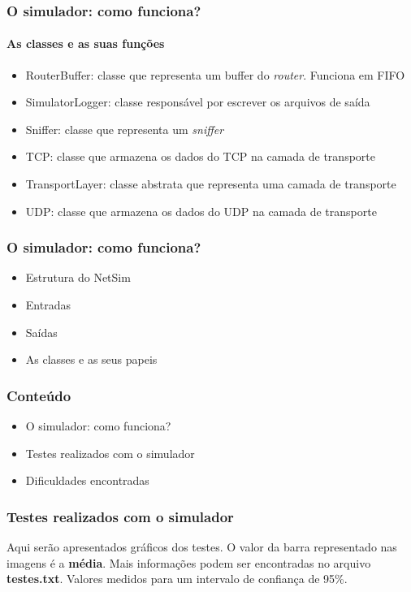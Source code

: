 \documentclass{beamer}
\begin{document}
\begin{frame}
	\frametitle{O simulador: como funciona?}
	\framesubtitle{As classes e as suas funções}
	\begin{itemize}
		\item RouterBuffer: classe que representa um buffer do \textit{router}. Funciona em FIFO
		\item SimulatorLogger: classe responsável por escrever os arquivos de saída
		\item Sniffer: classe que representa um \textit{sniffer}
		\item TCP: classe que armazena os dados do TCP na camada de transporte
		\item TransportLayer: classe abstrata que representa uma camada de transporte
		\item UDP: classe que armazena os dados do UDP na camada de transporte
	\end{itemize}
\end{frame}

\begin{frame}
	\frametitle{O simulador: como funciona?}
	\begin{itemize}
		\item \textcolor{covered}{Estrutura do NetSim}
		\item \textcolor{covered}{Entradas}
		\item \textcolor{covered}{Saídas}
		\item \textcolor{covered}{As classes e as seus papeis}
	\end{itemize}
\end{frame}

\begin{frame}
	\frametitle{Conteúdo}
	\begin{itemize}
		\item \textcolor{covered}{O simulador: como funciona?}
		\item Testes realizados com o simulador
		\item Dificuldades encontradas
	\end{itemize}
\end{frame}

\begin{frame}
	\frametitle{Testes realizados com o simulador}
	Aqui serão apresentados gráficos dos testes. O valor da barra representado nas imagens é a \textbf{média}.
	Mais informações podem ser encontradas no arquivo \textbf{testes.txt}. Valores medidos para um intervalo de confiança de 95\%.
\end{frame}
\end{document}
